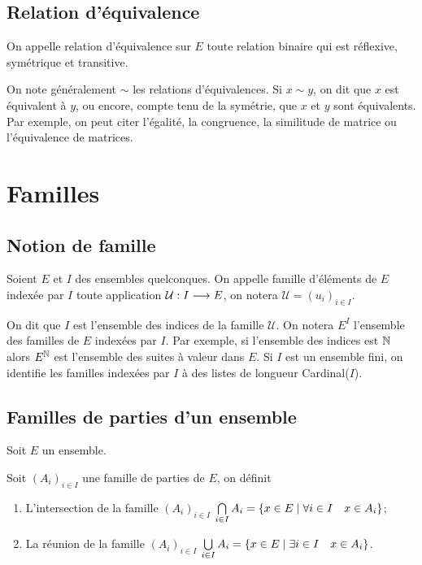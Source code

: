 \subsection{Relation d'équivalence}
\label{chap3-subsec:relationequivalence}
\begin{defdef}
    On appelle relation d'équivalence sur \(E\) toute relation binaire qui est 
    réflexive, symétrique et transitive.
\end{defdef}

On note généralement \(\sim\) les relations d'équivalences. Si \(x \sim y\), on 
dit que \(x\) est équivalent à \(y\), ou encore, compte tenu de la symétrie, que 
\(x\) et \(y\) sont équivalents. Par exemple, on peut citer l'égalité, la 
congruence, la similitude de matrice ou l'équivalence de matrices.

\section{Familles}
\label{chap3-sec:familles}

\subsection{Notion de famille}
\label{chap3-subsec:notionfamille}
\begin{defdef}
    Soient \(E\) et \(I\) des ensembles quelconques. On appelle famille 
    d'éléments de \(E\) indexée par \(I\) toute application 
    \(\mathcal{U}:I \longrightarrow E\), on notera \(\mathcal{U}=(u_i)_{i \in 
    I}\).
\end{defdef}

On dit que \(I\) est l'ensemble des indices de la famille \(\mathcal{U}\). On 
notera \(E^I\) l'ensemble des familles de \(E\) indexées par \(I\). Par exemple, 
si l'ensemble des indices est \(\mathbb{N}\) alors \(E^{\mathbb{N}}\) est l'ensemble des suites 
à valeur dans \(E\). Si \(I\) est un ensemble fini, on identifie les familles 
indexées par \(I\) à des listes de longueur Cardinal(\(I\)).

\subsection{Familles de parties d'un ensemble}
\label{chap3-subsec:familledeparties}

Soit \(E\) un ensemble.
\begin{defdef}
    Soit \((A_i)_{i \in I}\) une famille de parties de \(E\), on définit
    \begin{enumerate}
        \item L'intersection de la famille \((A_i)_{i \in I}\)  
            \(\bigcap\limits_{i \in I} A_i = \left\{x \in E\mathrel{}\middle|\mathrel{}\forall i \in I 
            \quad x \in A_i\right\}\);
        \item La réunion de la famille \((A_i)_{i \in I}\)  \(\bigcup\limits_{i 
            \in I} A_i = \left\{x \in E\mathrel{}\middle|\mathrel{}\exists i \in I \quad x \in A_i\right\}\).
    \end{enumerate}
\end{defdef}

